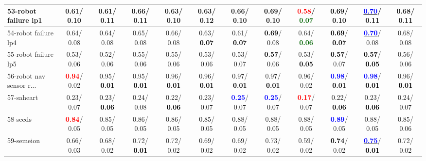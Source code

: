 \begin{table}[h]
\begin{center}
{\begin{tabular}{lc|c|c|c|c|c|c|c|c|c|c}
53-robot failure lp1 &   0.61/  0.10 &   0.61/  0.11 &   0.66/  0.11 &   0.63/  0.10 &   0.63/  0.12 &   0.66/  0.10 & \textcolor{black}{\textbf{  0.69}}/  0.10 & \textcolor{red}{\textbf{  0.58}}/\textcolor{darkgreen}{\textbf{  0.07}} & \textcolor{black}{\textbf{  0.69}}/  0.10 & \underline{\textcolor{blue}{\textbf{  0.70}}}/  0.11 &   0.68/  0.11 \\ \hline
54-robot failure lp4 &   0.64/  0.08 &   0.64/  0.08 &   0.65/  0.08 &   0.66/  0.08 &   0.63/\textcolor{black}{\textbf{  0.07}} &   0.61/\textcolor{black}{\textbf{  0.07}} & \textcolor{black}{\textbf{  0.69}}/  0.08 &   0.64/\textcolor{darkgreen}{\textbf{  0.06}} & \textcolor{black}{\textbf{  0.69}}/\textcolor{black}{\textbf{  0.07}} & \underline{\textcolor{blue}{\textbf{  0.70}}}/  0.08 &   0.68/  0.08 \\
55-robot failure lp5 &   0.53/  0.06 &   0.52/  0.06 &   0.55/  0.06 &   0.55/  0.06 &   0.53/  0.06 &   0.53/  0.07 & \textcolor{black}{\textbf{  0.57}}/  0.06 &   0.53/\textcolor{black}{\textbf{  0.05}} & \textcolor{black}{\textbf{  0.57}}/  0.07 & \textcolor{black}{\textbf{  0.57}}/\textcolor{black}{\textbf{  0.05}} &   0.56/  0.06 \\
56-robot nav sensor r... & \textcolor{red}{\textbf{  0.94}}/  0.02 &   0.95/\textcolor{black}{\textbf{  0.01}} &   0.95/\textcolor{black}{\textbf{  0.01}} &   0.96/\textcolor{black}{\textbf{  0.01}} &   0.96/\textcolor{black}{\textbf{  0.01}} &   0.97/\textcolor{black}{\textbf{  0.01}} &   0.97/\textcolor{black}{\textbf{  0.01}} &   0.96/  0.02 & \textcolor{blue}{\textbf{  0.98}}/\textcolor{black}{\textbf{  0.01}} & \textcolor{blue}{\textbf{  0.98}}/\textcolor{black}{\textbf{  0.01}} &   0.96/\textcolor{black}{\textbf{  0.01}} \\
57-saheart &   0.23/  0.07 &   0.23/\textcolor{black}{\textbf{  0.06}} &   0.24/  0.08 &   0.22/\textcolor{black}{\textbf{  0.06}} &   0.23/  0.07 & \textcolor{blue}{\textbf{  0.25}}/  0.07 & \textcolor{blue}{\textbf{  0.25}}/  0.07 & \textcolor{red}{\textbf{  0.17}}/  0.07 &   0.22/\textcolor{black}{\textbf{  0.06}} &   0.23/\textcolor{black}{\textbf{  0.06}} &   0.24/  0.07 \\
58-seeds & \textcolor{red}{\textbf{  0.84}}/  0.05 &   0.85/  0.05 &   0.86/  0.05 &   0.86/  0.05 &   0.85/  0.05 &   0.88/  0.05 &   0.88/  0.05 &   0.88/  0.05 & \textcolor{blue}{\textbf{  0.89}}/  0.05 &   0.88/  0.05 &   0.85/  0.06 \\
59-semeion &   0.66/  0.03 &   0.68/  0.02 &   0.72/\textcolor{black}{\textbf{  0.01}} &   0.72/  0.02 &   0.69/  0.02 &   0.69/  0.02 &   0.73/  0.02 &   0.59/  0.02 & \textcolor{black}{\textbf{  0.74}}/  0.02 & \underline{\textcolor{blue}{\textbf{  0.75}}}/\textcolor{black}{\textbf{  0.01}} &   0.72/  0.02 \\

\end{tabular}}
\end{center}
\end{table}

